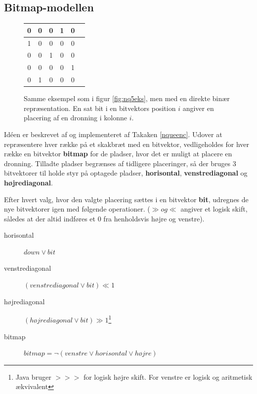 \documentclass[draft,a4paper,11pt]{article}
\begin{document}

\subsection{Bitmap-modellen}\label{bitmapmodellen}

\begin{figure}[!h]
\begin{center}
\begin{tabular}{|c|c|c|c|c|c}
\hline	0 & 0 & 0 & 1 & 0 \\
\hline	1 & 0 & 0 & 0 & 0 \\
\hline	0 & 0 & 1 & 0 & 0 \\
\hline	0 & 0 & 0 & 0 & 1 \\
\hline	0 & 1 & 0 & 0 & 0 \\
\hline
\end{tabular}
\end{center}
\caption{Samme eksempel som i figur \ref{fig:nq5eks}, men med en direkte binær repræsentation. En sat bit i en bitvektors position $i$ angiver en placering af en dronning i kolonne $i$.}
\label{fig:nq5eksbitmap}
\end{figure}

Idéen er beskrevet af \cite{Zongyan02} og implementeret af Takaken \ref{nqueenc}. Udover at repræsentere hver række på et skakbræt med en bitvektor, vedligeholdes for hver række  en bitvektor \textbf{bitmap} for de pladser, hvor det er muligt at placere en dronning.  Tilladte pladser begrænses af tidligere placeringer, så der bruges 3 bitvektorer til holde styr på optagede pladser, \textbf{horisontal}, \textbf{venstrediagonal}  og \textbf{højrediagonal}.

Efter hvert valg, hvor den valgte placering sættes i en bitvektor \textbf{bit}, udregnes de nye bitvektorer igen med følgende operationer. ($\gg og \ll$ angiver et logisk skift, således at der altid indføres et $0$ fra henholdsvis højre og venstre).
\begin{description}
	\item[horisontal] $down \lor bit$ 
	\item[venstrediagonal] $(venstrediagonal \lor bit) \ll 1$
	\item[højrediagonal] $(højrediagonal \lor bit) \gg  1$\footnote{Java bruger $>>>$ for logisk højre skift. For venstre er logisk og aritmetisk ækvivalent}
	\item[bitmap]	$bitmap = \lnot(venstre \lor horisontal \lor højre)$	
\end{description}
\end{document}
